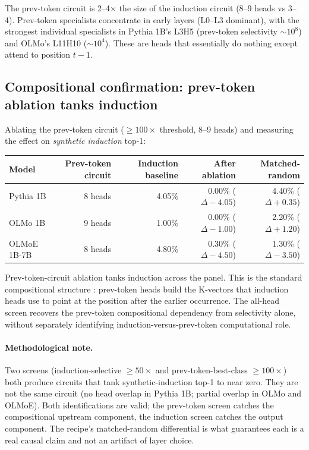 \documentclass[11pt]{article}
\begin{document}
The prev-token circuit is 2--4$\times$ the size of the induction circuit (8--9 heads vs 3--4). Prev-token specialists concentrate in early layers (L0--L3 dominant), with the strongest individual specialists in Pythia 1B's L3H5 (prev-token selectivity $\sim 10^8$) and OLMo's L11H10 ($\sim 10^4$). These are heads that essentially do nothing except attend to position $t-1$.

\subsection{Compositional confirmation: prev-token ablation tanks induction}

Ablating the prev-token circuit ($\geq 100\times$ threshold, 8--9 heads) and measuring the effect on \emph{synthetic induction} top-1:

\begin{center}
\footnotesize
\begin{tabular}{lrrrr}
\toprule
Model & Prev-token circuit & Induction baseline & After ablation & Matched-random \\
\midrule
Pythia 1B   & 8 heads & 4.05\% & 0.00\% ($\Delta -4.05$) & 4.40\% ($\Delta +0.35$) \\
OLMo 1B     & 9 heads & 1.00\% & 0.00\% ($\Delta -1.00$) & 2.20\% ($\Delta +1.20$) \\
OLMoE 1B-7B & 8 heads & 4.80\% & 0.30\% ($\Delta -4.50$) & 1.30\% ($\Delta -3.50$) \\
\bottomrule
\end{tabular}
\end{center}

Prev-token-circuit ablation tanks induction across the panel. This is the standard compositional structure \citep{olsson2022induction}: prev-token heads build the K-vectors that induction heads use to point at the position after the earlier occurrence. The all-head screen recovers the prev-token compositional dependency from selectivity alone, without separately identifying induction-versus-prev-token computational role.

\paragraph{Methodological note.} Two screens (induction-selective $\geq 50\times$ and prev-token-best-class $\geq 100\times$) both produce circuits that tank synthetic-induction top-1 to near zero. They are not the same circuit (no head overlap in Pythia 1B; partial overlap in OLMo and OLMoE). Both identifications are valid; the prev-token screen catches the compositional upstream component, the induction screen catches the output component. The recipe's matched-random differential is what guarantees each is a real causal claim and not an artifact of layer choice.
\end{document}
